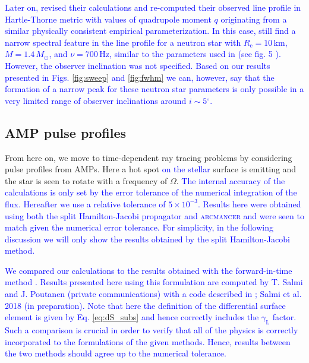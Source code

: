 \documentclass{aa}
\newcommand{\refe}[1]{\textcolor{blue}{{#1}}}
\newcommand{\refedel}[1]{}
\newcommand{\Msun}{\ensuremath{M_{\odot}}}
\newcommand{\lgamma}{\gamma_{\text{L}}}
\renewcommand{\deg}{\ensuremath{^{\circ}}}
\begin{document}
\refe{
Later on, \citet{BBP13} revised their calculations and re-computed their observed line profile in Hartle-Thorne metric with values of quadrupole moment $q$ originating from a similar physically consistent empirical parameterization.
In this case, \citet{BBP13} still find a narrow spectral feature in the line profile for a neutron star with $R_{\mathrm{e}} = 10\,\mathrm{km}$, $M=1.4\,\Msun$, and $\nu = 700\,\mathrm{Hz}$, similar to the parameters used in \citet{BPO13} (see fig. 5 \citealt{BBP13}).
However, the observer inclination was not specified.
Based on our results presented in Figs. \ref{fig:sweep} and \ref{fig:fwhm} we can, however, say that the formation of a narrow peak for these neutron star parameters is only possible in a very limited range of observer inclinations around $i \sim 5\deg$.
}




\subsection{AMP pulse profiles}\label{sect:AMPs}

From here on, we move to time-dependent ray tracing problems by considering pulse profiles from AMPs.
Here a hot spot\refedel{ on top of} \refe{on the stellar} surface is emitting and the star is seen to rotate with a frequency of $\Omega$.
\refe{The internal accuracy of the calculations is only set by the error tolerance of the numerical integration of the flux.
Hereafter we use a relative tolerance of $5 \times 10^{-3}$.
Results here were obtained using both the split Hamilton-Jacobi propagator and \textsc{arcmancer} and were seen to match given the numerical error tolerance.
For simplicity, in the following discussion we will only show the results obtained by the split Hamilton-Jacobi method.
}

\refe{
We compared our calculations to the results obtained with the forward-in-time method \citep[see e.g.,][]{PB06, MLC07}.
Results presented here using this formulation are computed by T. Salmi and J. Poutanen (private communications) with a code described in \citet{PB06}; Salmi et al. 2018 (in preparation).
Note that here the definition of the differential surface element is given by Eq. \eqref{eq:dS_subs} and hence correctly includes the $\lgamma$ factor.
Such a comparison is crucial in order to verify that all of the physics is correctly incorporated to the formulations of the given methods.
Hence, results between the two methods should agree up to the numerical tolerance.
}
\end{document}
